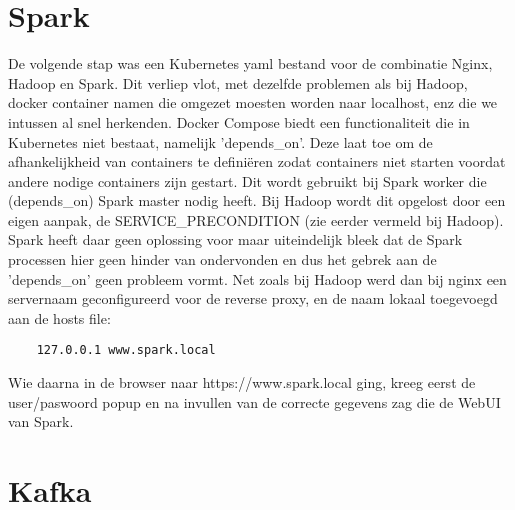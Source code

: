 \section{Spark}

De volgende stap was een Kubernetes yaml bestand voor de combinatie Nginx, Hadoop en Spark. Dit verliep vlot, met dezelfde problemen als bij Hadoop, docker container namen die omgezet moesten worden naar localhost, enz die we intussen al snel herkenden.
\newline
\newline
Docker Compose biedt een functionaliteit die in Kubernetes niet bestaat, namelijk 'depends\_on'. Deze laat toe om de afhankelijkheid van containers te definiëren zodat containers niet starten voordat andere nodige containers zijn gestart. Dit wordt gebruikt bij Spark worker die (depends\_on) Spark master nodig heeft.
Bij Hadoop wordt dit opgelost door een eigen aanpak, de SERVICE\_PRECONDITION (zie eerder vermeld bij Hadoop).
\newline
\newline
Spark heeft daar geen oplossing voor maar uiteindelijk bleek dat de Spark processen hier geen hinder van ondervonden en dus het gebrek aan de 'depends\_on' geen probleem vormt.
\newline
\newline
Net zoals bij Hadoop werd dan bij nginx een servernaam geconfigureerd voor de reverse proxy, en de naam lokaal toegevoegd aan de hosts file:
\begin{lstlisting}
    127.0.0.1 www.spark.local
\end{lstlisting}

Wie daarna in de browser naar https://www.spark.local ging, kreeg eerst de user/paswoord popup en na invullen van de correcte gegevens zag die de WebUI van Spark.

\section{Kafka}

